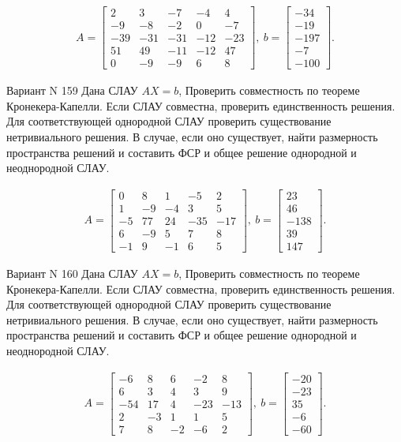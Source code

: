\documentclass[11pt]{report}
\begin{document}
\begin{align*}
 A = \left[\begin{matrix}2 & 3 & -7 & -4 & 4\\-9 & -8 & -2 & 0 & -7\\-39 & -31 & -31 & -12 & -23\\51 & 49 & -11 & -12 & 47\\0 & -9 & -9 & 6 & 8\end{matrix}\right],
\ b = \left[\begin{matrix}-34\\-19\\-197\\-7\\-100\end{matrix}\right]. 
 \end{align*}

Вариант N 159
Дана СЛАУ $AX = b$,
Проверить совместность по теореме Кронекера-Капелли. Если СЛАУ совместна, проверить единственность решения.
Для соответствующей однородной СЛАУ проверить существование нетривиального решения. В случае, если оно существует,
найти размерность пространства решений и составить ФСР и общее решение однородной  и неоднородной СЛАУ.


\begin{align*}
 A = \left[\begin{matrix}0 & 8 & 1 & -5 & 2\\1 & -9 & -4 & 3 & 5\\-5 & 77 & 24 & -35 & -17\\6 & -9 & 5 & 7 & 8\\-1 & 9 & -1 & 6 & 5\end{matrix}\right],
\ b = \left[\begin{matrix}23\\46\\-138\\39\\147\end{matrix}\right]. 
 \end{align*}

Вариант N 160
Дана СЛАУ $AX = b$,
Проверить совместность по теореме Кронекера-Капелли. Если СЛАУ совместна, проверить единственность решения.
Для соответствующей однородной СЛАУ проверить существование нетривиального решения. В случае, если оно существует,
найти размерность пространства решений и составить ФСР и общее решение однородной  и неоднородной СЛАУ.


\begin{align*}
 A = \left[\begin{matrix}-6 & 8 & 6 & -2 & 8\\6 & 3 & 4 & 3 & 9\\-54 & 17 & 4 & -23 & -13\\2 & -3 & 1 & 1 & 5\\7 & 8 & -2 & -6 & 2\end{matrix}\right],
\ b = \left[\begin{matrix}-20\\-23\\35\\-6\\-60\end{matrix}\right]. 
 \end{align*}
\end{document}
